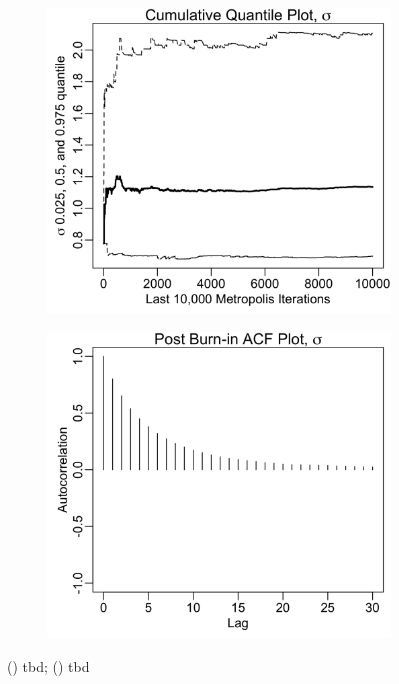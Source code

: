 \documentclass{uwstat572}
\begin{document}
\begin{figure}[H]
	\centering
	\begin{subfigure}[b]{0.49\textwidth}
		\includegraphics[width=\textwidth]{figures/mcmc_cum_quant_plot_sigma.png}
		\caption{}
		\label{fig:quant_sigma}
	\end{subfigure}
	\hfill
	\begin{subfigure}[b]{0.49\textwidth}
		\includegraphics[width=\textwidth]{figures/mcmc_acf_plot_sigma.png}
		\caption{}
		\label{fig:acf_sigma}
	\end{subfigure}
	\caption{() tbd; () tbd }
	\label{fig:data_plot}
\end{figure} 
\end{document}
